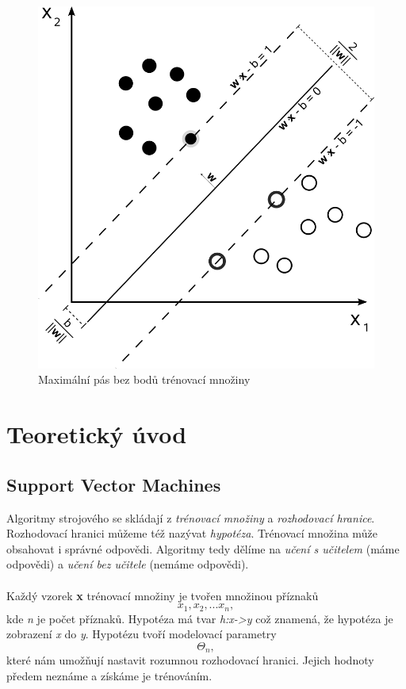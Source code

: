\documentclass[a4]{article}
\begin{document}
\begin{figure}[!ht]
	\centering
		\includegraphics[scale=0.25]{images/svm_vectors}
	\caption{Maximální pás bez bodů trénovací množiny \cite{svm_vectors}}
	\label{fig:svm_vectors}
\end{figure}

\section{Teoretický úvod}

\subsection{Support Vector Machines}
Algoritmy strojového se skládají z \textit{trénovací množiny} a \textit{rozhodovací hranice}. Rozhodovací hranici můžeme též nazývat \textit{hypotéza}. Trénovací množina může obsahovat i správné odpovědi. Algoritmy tedy dělíme na \textit{učení s učitelem} (máme odpovědi) a \textit{učení bez učitele} (nemáme odpovědi).
\\\\
Každý vzorek \textbf{x} trénovací množiny je tvořen množinou příznaků $${x_1,x_2,...x_n},$$kde \textit{n} je počet příznaků. Hypotéza má tvar \textit{h:x->y} což znamená, že hypotéza je zobrazení \textit{x} do \textit{y}. Hypotézu tvoří modelovací parametry $$\Theta_{n},$$které nám umožňují nastavit rozumnou rozhodovací hranici. Jejich hodnoty předem neznáme a získáme je trénováním.
\end{document}
